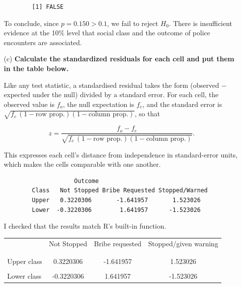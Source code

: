\documentclass[12pt,letterpaper]{article}
\begin{document}
\begin{enumerate}
	
		\begin{verbatim}
		[1] FALSE
	\end{verbatim}
	To conclude, since $p = 0.150 > 0.1$, we fail to reject $H_0$. There is insufficient evidence at the 10\% level that social class and the outcome of police encounters are associated.
	\vspace{1cm}
	
	\item [(c)] \textbf{Calculate the standardized residuals for each cell and put them in the table below.}
	\vspace{0.5cm}
	
	Like any test statistic, a standardised residual takes the form (observed $-$ expected under the null) divided by a standard error. For each cell, the observed value is $f_o$, the null expectation is $f_e$, and the standard error is $\sqrt{f_e\,(1-\text{row prop.})(1-\text{column prop.})}$, so that
	
	\[
	z = \frac{f_o - f_e}{\sqrt{f_e\,(1-\text{row prop.})(1-\text{column prop.})}}.
	\] 
	
	This expresses each cell's distance from independence in standard-error units, which makes the cells comparable with one another.
	
	
	\begin{verbatim}
					Outcome
		Class   Not Stopped Bribe Requested Stopped/Warned
		Upper   0.3220306       -1.641957       1.523026
		Lower  -0.3220306        1.641957      -1.523026
	\end{verbatim}
	
	
	I checked that the results match R's built-in function.
	
	
	\begin{table}[h]
		\centering
		\begin{tabular}{l | c c c }
			& Not Stopped & Bribe requested & Stopped/given warning \\
			\\[-1.8ex] 
			\hline \\[-1.8ex]
			Upper class  & 0.3220306 & -1.641957 & 1.523026  \\
			\\
			Lower class & -0.3220306 & 1.641957  & -1.523026  \\
			

\end{tabular}
\end{table}
\end{enumerate}
\end{document}
